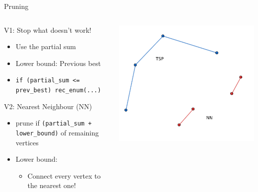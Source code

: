 \begin{frame}{Pruning}
  \vspace*{-0.5cm}
  \begin{columns}
    \begin{column}{0.5\textwidth}
      \begin{block}{V1: Stop what doesn't work!}
        \begin{itemize}
          \item Use the partial sum
          \item Lower bound: Previous best
          \item {\small\texttt{if (partial\_sum <= prev\_best) rec\_enum(...)}}
        \end{itemize}
      \end{block}
      \pause
      \begin{block}{V2: Nearest Neighbour (NN)}
        \begin{itemize}
          \item prune if \texttt{(partial\_sum + lower\_bound)} of remaining vertices
          \item Lower bound:
            \begin{itemize}
              \item Connect every vertex to the nearest one!
            \end{itemize}
        \end{itemize}
      \end{block}
    \end{column}
    \pause
    \begin{column}{0.5\textwidth}
      \includegraphics[width=\textwidth]{./assets/nn.png}
    \end{column}
  \end{columns}
\end{frame}

